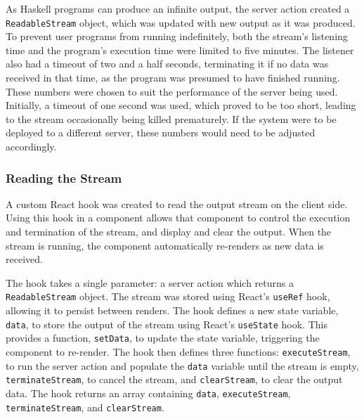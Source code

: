 \documentclass[../main.tex]{subfiles}
\begin{document}
                As Haskell programs can produce an infinite output, the server action created a
                    \texttt{ReadableStream} object, which was updated with new output as it was
                    produced.
                To prevent user programs from running indefinitely, both the stream's listening
                    time and the program's execution time were limited to five minutes.
                The listener also had a timeout of two and a half seconds, terminating it if no
                    data was received in that time, as the program was presumed to have finished
                    running.
                These numbers were chosen to suit the performance of the server being used.
                Initially, a timeout of one second was used, which proved to be too short,
                    leading to the stream occasionally being killed prematurely.
                If the system were to be deployed to a different server, these numbers would
                    need to be adjusted accordingly.

            \subsubsection{Reading the Stream}
                A custom React hook was created to read the output stream on the client side.
                Using this hook in a component allows that component to control the execution
                    and termination of the stream, and display and clear the output.
                When the stream is running, the component automatically re-renders as new data
                    is received.

                The hook takes a single parameter: a server action which returns a
                    \texttt{ReadableStream} object.
                The stream was stored using React's \texttt{useRef} hook, allowing it to
                    persist between renders.
                The hook defines a new state variable, \texttt{data}, to store the output of
                    the stream using React's \texttt{useState} hook.
                This provides a function, \texttt{setData}, to update the state variable,
                    triggering the component to re-render.
                The hook then defines three functions: \texttt{executeStream}, to run the
                    server action and populate the \texttt{data} variable until the stream is
                    empty, \texttt{terminateStream}, to cancel the stream, and
                    \texttt{clearStream}, to clear the output data.
                The hook returns an array containing \texttt{data}, \texttt{executeStream},
                    \texttt{terminateStream}, and \texttt{clearStream}.
\end{document}
